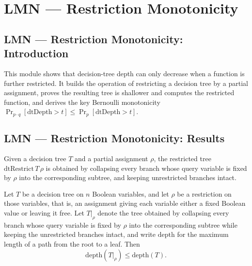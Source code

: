 \section{LMN --- Restriction Monotonicity}
\subsection*{LMN --- Restriction Monotonicity: Introduction}

This module shows that decision-tree depth can only decrease when a function is further
restricted. It builds the operation of restricting a decision tree by a partial
assignment, proves the resulting tree is shallower and computes the restricted function,
and derives the key Bernoulli monotonicity $\Pr_{p\cdot q}[\mathrm{dtDepth} > t] \le
\Pr_{p}[\mathrm{dtDepth} > t]$.

\subsection*{LMN --- Restriction Monotonicity: Results}

\begin{definition}
\label{LMN.dtRestrict}
\leanok
{}
Given a decision tree $T$ and a partial assignment $\rho$, the restricted tree
$\mathrm{dtRestrict}\,T\,\rho$ is obtained by collapsing every branch whose query variable
is fixed by $\rho$ into the corresponding subtree, and keeping unrestricted branches intact.
\end{definition}

\begin{theorem}
\label{LMN.dtRestrict_depth_le}
\leanok
{}
Let $T$ be a decision tree on $n$ Boolean variables, and let $\rho$ be a restriction on
those variables, that is, an assignment giving each variable either a fixed Boolean
value or leaving it free. Let $T|_\rho$ denote the tree obtained by collapsing every
branch whose query variable is fixed by $\rho$ into the corresponding subtree while
keeping the unrestricted branches intact, and write $\mathrm{depth}$ for the maximum
length of a path from the root to a leaf. Then
\[
\mathrm{depth}(T|_\rho) \le \mathrm{depth}(T).
\]
\end{theorem}

